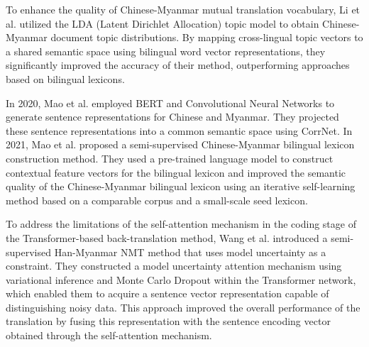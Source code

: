 \documentclass[acmsmall]{acmart}
\begin{document}
To enhance the quality of Chinese-Myanmar mutual translation vocabulary, Li et al. \cite{4-2-24} utilized the LDA (Latent Dirichlet Allocation) topic model to obtain Chinese-Myanmar document topic distributions. By mapping cross-lingual topic vectors to a shared semantic space using bilingual word vector representations, they significantly improved the accuracy of their method, outperforming approaches based on bilingual lexicons.

In 2020, Mao et al. \cite{4-2-25} employed BERT and Convolutional Neural Networks to generate sentence representations for Chinese and Myanmar. They projected these sentence representations into a common semantic space using CorrNet. In 2021, Mao et al. \cite{4-2-26} proposed a semi-supervised Chinese-Myanmar bilingual lexicon construction method. They used a pre-trained language model to construct contextual feature vectors for the bilingual lexicon and improved the semantic quality of the Chinese-Myanmar bilingual lexicon using an iterative self-learning method based on a comparable corpus and a small-scale seed lexicon.

To address the limitations of the self-attention mechanism in the coding stage of the Transformer-based back-translation method, Wang et al. \cite{4-2-27} introduced a semi-supervised Han-Myanmar NMT method that uses model uncertainty as a constraint. They constructed a model uncertainty attention mechanism using variational inference and Monte Carlo Dropout within the Transformer network, which enabled them to acquire a sentence vector representation capable of distinguishing noisy data. This approach improved the overall performance of the translation by fusing this representation with the sentence encoding vector obtained through the self-attention mechanism.
\end{document}
